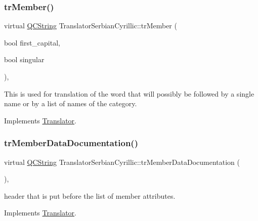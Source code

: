 \subsubsection{\texorpdfstring{trMember()}{trMember()}}
{\footnotesize\ttfamily virtual \mbox{\hyperlink{class_q_c_string}{Q\+C\+String}} Translator\+Serbian\+Cyrillic\+::tr\+Member (\begin{DoxyParamCaption}\item[{bool}]{first\+\_\+capital,  }\item[{bool}]{singular }\end{DoxyParamCaption})\hspace{0.3cm}{\ttfamily [inline]}, {\ttfamily [virtual]}}

This is used for translation of the word that will possibly be followed by a single name or by a list of names of the category. 

Implements \mbox{\hyperlink{class_translator}{Translator}}.

\mbox{\label{class_translator_serbian_cyrillic_a9abe011418662c8a690e4a36d70057bb}} 
\subsubsection{\texorpdfstring{trMemberDataDocumentation()}{trMemberDataDocumentation()}}
{\footnotesize\ttfamily virtual \mbox{\hyperlink{class_q_c_string}{Q\+C\+String}} Translator\+Serbian\+Cyrillic\+::tr\+Member\+Data\+Documentation (\begin{DoxyParamCaption}{ }\end{DoxyParamCaption})\hspace{0.3cm}{\ttfamily [inline]}, {\ttfamily [virtual]}}

header that is put before the list of member attributes. 

Implements \mbox{\hyperlink{class_translator}{Translator}}.

\mbox{\label{class_translator_serbian_cyrillic_a9f5755ce6f2841cca1744a056318fc48}} 
